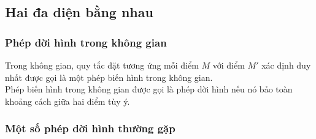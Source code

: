 \subsection{Hai đa diện bằng nhau}
\subsubsection{Phép dời hình trong không gian}
Trong không gian, quy tắc đặt tương ứng mỗi điểm $M$ với điểm $M'$ xác định duy nhất được gọi là một phép biến hình trong không gian.\\
Phép biến hình trong không gian được gọi là phép dời hình nếu nó bảo toàn khoảng cách giữa hai điểm tùy ý.
\subsubsection{Một số phép dời hình thường gặp}
{
}

